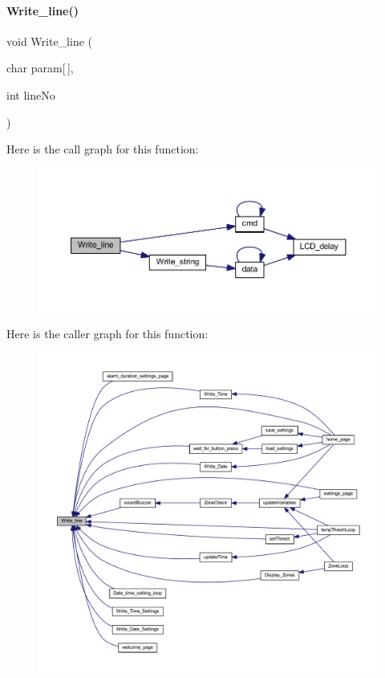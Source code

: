 \paragraph{Write\+\_\+line()}
{\footnotesize\ttfamily void Write\+\_\+line (\begin{DoxyParamCaption}\item[{char}]{param[$\,$],  }\item[{int}]{line\+No }\end{DoxyParamCaption})}

Here is the call graph for this function\+:
\nopagebreak
\begin{figure}[H]
\begin{center}
\leavevmode
\includegraphics[width=350pt]{a00032_a7a79900a1e7306db896b33ca4a068108_cgraph}
\end{center}
\end{figure}
Here is the caller graph for this function\+:
\nopagebreak
\begin{figure}[H]
\begin{center}
\leavevmode
\includegraphics[width=350pt]{a00032_a7a79900a1e7306db896b33ca4a068108_icgraph}
\end{center}
\end{figure}
\mbox{\label{a00032_ade43d0cfa2e755883a7c353a07e7ed0d}} 
